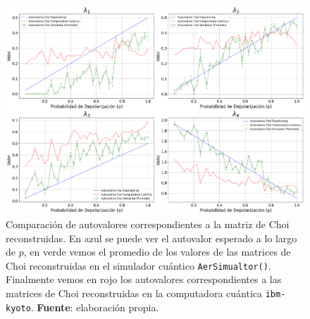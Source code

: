 \documentclass[letterpaper,12pt]{thesisECFM}
\theoremstyle{plain}
\theoremstyle{definition}
\theoremstyle{definition}
\theoremstyle{remark}
\newcommand{\1}{\mathbb{1}}
\begin{document}
\begin{figure}[h!] 
    \centering 
    \includegraphics[width=0.90 \linewidth]{imagenes/eigenvalores_comparacion.png}
    \caption{Comparación de autovalores correspondientes a la matriz de Choi reconstruidas. En azul se puede ver el autovalor esperado a lo largo de $p$, en verde vemos el promedio de los valores de las matrices de Choi reconstruidas  en el simulador cuántico \texttt{AerSimualtor()}. Finalmente vemos en rojo los autovalores correspondientes a las matrices de Choi reconstruidas en la computadora cuántica \texttt{ibm-kyoto}. \textbf{Fuente}: elaboración propia. }
    \label{fig:comparacion_autovalores}
\end{figure}
\end{document}
